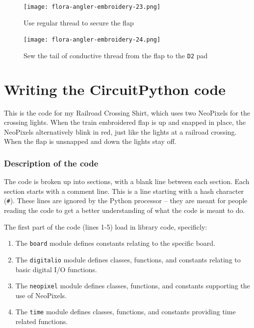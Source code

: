 \documentclass[letterpaper,twoside,12pt]{article}
\begin{document}
\begin{figure}[hbpt]\begin{centering}%
\texttt{[image: flora-angler-embroidery-23.png]}
\caption{Use regular thread to secure the flap}
\label{fig:flora-angler-embroidery-23}
\end{centering}\end{figure}
\begin{figure}[hbpt]\begin{centering}%
\texttt{[image: flora-angler-embroidery-24.png]}
\caption{Sew the tail of conductive thread from the flap to the \texttt{D2} pad}
\label{fig:flora-angler-embroidery-24}
\end{centering}\end{figure}
\clearpage
\part{Writing the CircuitPython code}

This is the code for my Railroad Crossing Shirt, which uses two NeoPixels for 
the crossing lights.  When the train embroidered flap is up and snapped in 
place, the NeoPixels alternatively blink in red, just like the lights at a 
railroad crossing.  When the flap is unsnapped and down the lights stay off.
\section{Description of the code}

The code is broken up into sections, with a blank line between each section.
Each section starts with a comment line. This is a line starting with a hash
character (\texttt{\#}). These lines are ignored by the Python processor -- they
are meant for people reading the code to get a better understanding of what
the code is meant to do.

The first part of the code (lines 1-5) load in library code, specificly:
\begin{enumerate}
\item The \texttt{board} module defines constants relating to the specific 
board.
\item The \texttt{digitalio} module defines classes, functions, and constants 
relating to basic digital I/O functions.
\item The \texttt{neopixel} module defines classes, functions, and constants 
supporting the use of NeoPixels.
\item The \texttt{time} module defines classes, functions, and constants 
providing time related functions.
\end{enumerate}
\end{document}
